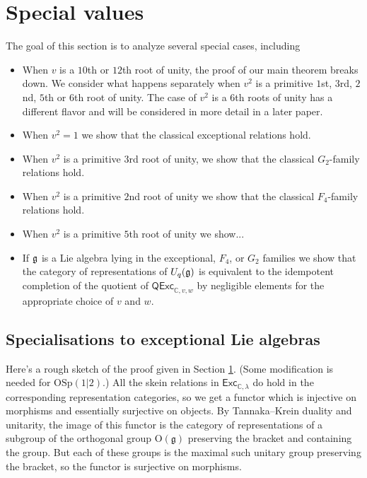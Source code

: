 \documentclass[12pt]{amsart}
\begin{document}
\section{Special values}
\label{sec:special-values}

The goal of this section is to analyze several special cases,
including
\begin{itemize}
\item When $v$ is a $10$th or $12$th root of unity, the proof of our main theorem breaks down.  We consider
  what happens separately when $v^2$ is a primitive $1$st, $3$rd, $2$nd, $5$th or $6$th
  root of unity.  The case of $v^2$ is a $6$th roots of unity has a different flavor and will be 
  considered in more detail in a later paper.
\item When $v^2=1$ we show that the classical exceptional relations hold.
\item When $v^2$ is a primitive $3$rd root of unity, we show that the classical $G_2$-family relations hold.
\item When $v^2$ is a primitive $2$nd root of unity we show that the classical $F_4$-family relations hold.
\item When $v^2$ is a primitive $5$th root of unity we show...
\item If ${\mathfrak g}$ is a Lie algebra lying in the exceptional, $F_4$, or $G_2$ families we show that the category of representations of $U_q({\mathfrak g})$ is equivalent to the idempotent completion of the quotient of $\mathsf{QExc}_{\mathbb{C},v,w}$ by negligible elements for the appropriate choice of $v$ and $w$.
\end{itemize}



\subsection{Specialisations to exceptional Lie algebras}%

Here's a rough sketch of the proof given in Section \ref{sec:special-values}.
(Some modification is
needed for $\mathrm{OSp}(1|2)$.)  All the skein relations in
$\mathsf{Exc}_{\mathbb{C},\lambda}$ do hold in the corresponding
representation categories, so we get a functor which is injective on morphisms
and essentially surjective on objects.  By Tannaka--Krein duality and
unitarity, the image of this functor is the category of representations of a
subgroup of the orthogonal group $\mathrm{O}(\mathfrak{g})$ preserving the bracket and containing
the group.  But each of these groups is the maximal such unitary group
preserving the bracket, so the functor is surjective on morphisms.
\end{document}
